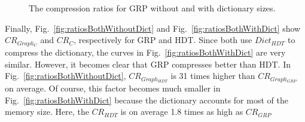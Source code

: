\begin{figure}[h]
	\centering
	\hfill
	\caption{The compression ratios for GRP without and with dictionary sizes.}
\end{figure}

Finally, Fig.~\ref{fig:ratiosBothWithoutDict} and Fig.~\ref{fig:ratiosBothWithDict} show $CR_{Graph_C}$ and $CR_C$, respectively for GRP and HDT. Since both use $Dict_{HDT}$ to compress the dictionary, the curves in Fig.~\ref{fig:ratiosBothWithDict} are very similar. However, it becomes clear that GRP compresses better than HDT. In Fig.~\ref{fig:ratiosBothWithoutDict}, $CR_{Graph_{HDT}}$ is 31 times higher than $CR_{Graph_{GRP}}$ on average. Of course, this factor becomes much smaller in Fig.~\ref{fig:ratiosBothWithDict} because the dictionary accounts for most of the memory size. Here, the $CR_{HDT}$ is on average 1.8 times as high as $CR_{GRP}$

